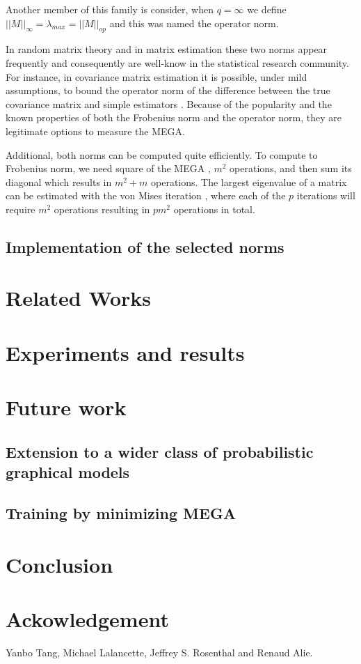 \documentclass{article}
\begin{document}
\bigskip

Another member of this family is consider, when $q=\infty$ we define $||M||_\infty = \lambda_{max} = ||M||_{op}$ and this was named the operator norm.

\bigskip

In random matrix theory and in matrix estimation these two norms appear frequently and consequently are well-know in the statistical research community. For instance, in covariance matrix estimation it is possible, under mild assumptions, to bound the operator norm of the difference between the true covariance matrix and simple estimators \cite{rigollet15}. Because of the popularity and the known properties of both the Frobenius norm and the operator norm, they are legitimate options to measure the MEGA. 

\bigskip

Additional, both norms can be computed quite efficiently. To compute to Frobenius norm, we need square of the MEGA , $m^2$ operations, and then sum its diagonal which results in $m^2+m$ operations. The largest eigenvalue of a matrix can be estimated with the von Mises iteration \cite{mises29}, where each of the $p$ iterations will require $m^2$ operations resulting in $pm^2$ operations in total.


\subsection{Implementation of the selected norms}

\section{Related Works}

\section{Experiments and results}

\section{Future work}
\subsection{Extension to a wider class of probabilistic graphical models}
\subsection{Training by minimizing MEGA}

\section{Conclusion}

\section*{Ackowledgement}

Yanbo Tang, Michael Lalancette, Jeffrey S. Rosenthal and Renaud Alie.

\pagebreak


\bigskip
\end{document}
